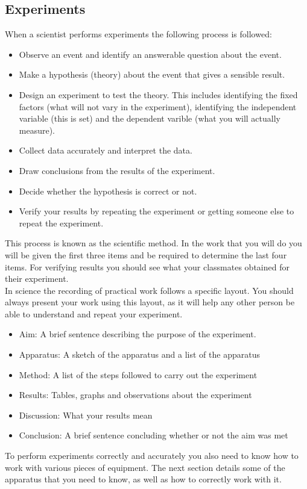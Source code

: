 \begin{enumerate}[label=\textbf{\arabic*}.]
\subsection*{Experiments}
When a scientist performs experiments the following process is followed:
\begin{itemize}
\item Observe an event and identify an answerable question about the event.
\item Make a hypothesis (theory) about the event that gives a sensible result.
\item Design an experiment to test the theory. This includes identifying the fixed factors (what will not vary in the experiment), identifying the independent variable (this is set) and the dependent varible (what you will actually measure).
\item Collect data accurately and interpret the data.
\item Draw conclusions from the results of the experiment.
\item Decide whether the hypothesis is correct or not.
\item Verify your results by repeating the experiment or getting someone else to repeat the experiment.
\end{itemize}
This process is known as the scientific method. In the work that you will do you will be given the first three items and be required to determine the last four items. For verifying results you should see what your classmates obtained for their experiment. \\
In science the recording of practical work follows a specific layout. You should always present your work using this layout, as it will help any other person be able to understand and repeat your experiment.
\begin{itemize}
\item Aim: A brief sentence describing the purpose of the experiment.
\item Apparatus: A sketch of the apparatus and a list of the apparatus
\item Method: A list of the steps followed to carry out the experiment
\item Results: Tables, graphs and observations about the experiment
\item Discussion: What your results mean
\item Conclusion: A brief sentence concluding whether or not the aim was met
\end{itemize}
To perform experiments correctly and accurately you also need to know how to work with various pieces of equipment. The next section details some of the apparatus that you need to know, as well as how to correctly work with it.\\

\end{enumerate}
